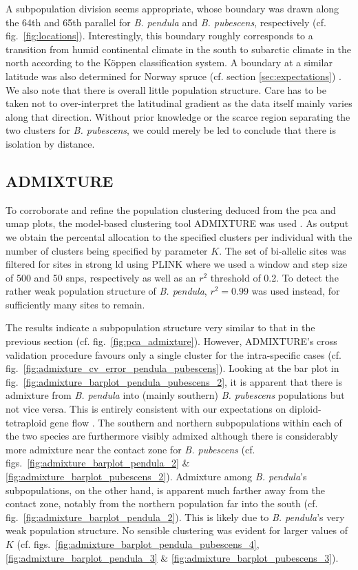\documentclass[hidelinks,11pt]{article}
\newcommand{\pendula}{\textit{B. pendula}}
\newcommand{\pubescens}{\textit{B. pubescens}}
\begin{document}
{    A subpopulation division seems appropriate, whose boundary was drawn along the 64th and 65th parallel for \pendula{} and \pubescens{}, respectively (cf. fig.~\ref{fig:locations}). Interestingly, this boundary roughly corresponds to a transition from humid continental climate in the south to subarctic climate in the north according to the Köppen classification system. A boundary at a similar latitude was also determined for Norway spruce (cf. section \ref{sec:expectations}) \cite{spruce-demography}. We also note that there is overall little population structure. Care has to be taken not to over-interpret the latitudinal gradient as the data itself mainly varies along that direction. Without prior knowledge or the scarce region separating the two clusters for \pubescens{}, we could merely be led to conclude that there is isolation by distance.

    \subsection{ADMIXTURE}
    \label{admixture}

    To corroborate and refine the population clustering deduced from the \acrshort{pca} and \acrshort{umap} plots, the model-based clustering tool \mbox{ADMIXTURE} was used \cite{admixture}. As output we obtain the percental allocation to the specified clusters per individual with the number of clusters being specified by parameter $K$. The set of bi-allelic sites was filtered for sites in strong \acrshort{ld} using PLINK where we used a window and step size of 500 and 50 \acrshort{snp}s, respectively as well as an $r^2$ threshold of 0.2. To detect the rather weak population structure of \pendula{}, $r^2=0.99$ was used instead, for sufficiently many sites to remain.
    
    The results indicate a subpopulation structure very similar to that in the previous section (cf. fig.~\ref{fig:pca_admixture}). However, \mbox{ADMIXTURE}'s cross validation procedure favours only a single cluster for the intra-specific cases (cf. fig.~\ref{fig:admixture_cv_error_pendula_pubescens}). Looking at the bar plot in fig.~\ref{fig:admixture_barplot_pendula_pubescens_2}, it is apparent that there is admixture from \pendula{} into (mainly southern) \pubescens{} populations but not vice versa. This is entirely consistent with our expectations on diploid-tetraploid gene flow \cite{stebbins,birch-unidirectional-introgression}. The southern and northern subpopulations within each of the two species are furthermore visibly admixed although there is considerably more admixture near the contact zone for \pubescens{} (cf. figs.~\ref{fig:admixture_barplot_pendula_2} \& \ref{fig:admixture_barplot_pubescens_2}). Admixture among \pendula{}'s subpopulations, on the other hand, is apparent much farther away from the contact zone, notably from the northern population far into the south (cf. fig.~\ref{fig:admixture_barplot_pendula_2}). This is likely due to \pendula{}'s very weak population structure. No sensible clustering was evident for larger values of $K$ (cf. figs.~\ref{fig:admixture_barplot_pendula_pubescens_4}, \ref{fig:admixture_barplot_pendula_3} \& \ref{fig:admixture_barplot_pubescens_3}).

}
\end{document}
